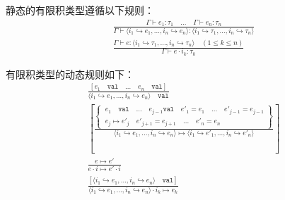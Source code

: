 静态的有限积类型遵循以下规则：
\begin{subequations}
    \begin{gather}
    \label{equ:10.3a}\frac{\Gamma \vdash e_1 : \tau_1 \quad \dots \quad \Gamma \vdash e_n : \tau_n}
    {\Gamma \vdash \langle i_1 \hookrightarrow e_1,\dots,i_n\hookrightarrow e_n \rangle
    : \langle i_1 \hookrightarrow \tau_1,\dots,i_n \hookrightarrow \tau_n \rangle} \\
    \label{equ:10.3b}\frac{\Gamma \vdash e : \langle i_1 \hookrightarrow \tau_1,\dots,i_n \hookrightarrow \tau_n \rangle
    \quad (1\leq k \leq n)}
    {\Gamma \vdash e \cdot i_k : \tau_k}
    \end{gather}
\end{subequations}


有限积类型的动态规则如下：
\begin{subequations}
    \begin{gather}
    \frac{[e_1 \quad \mathtt{val} \quad \dots \quad e_n \quad \mathtt{val}]}
    {\langle i_1 \hookrightarrow e_1,\dots,i_n\hookrightarrow e_n \rangle \quad \mathtt{val}} \\
    \label{rule10.4b}\left[
        \frac{\left\{\
        \begin{array}{l}
            e_1 \quad \mathtt{val} \quad \dots \quad e_{j-1} \mathtt{val} \quad e'_1=e_1 \quad \dots \quad e'_{j-1}=e_{j-1}  \\
            e_j \longmapsto e'_j \quad e'_{j+1}=e_{j+1} \quad \dots \quad e'_n=e_n
        \end{array}
        \right\}}
        {\langle i_1 \hookrightarrow e_1,\dots,i_n\hookrightarrow e_n \rangle
        \longmapsto \langle i_1 \hookrightarrow e'_1,\dots,i_n\hookrightarrow e'_n \rangle}
    \right] \\
    \frac{e \longmapsto e'}{e\cdot i \longmapsto e' \cdot i} \\
    \frac{[\langle i_1 \hookrightarrow e_1,\dots,i_n\hookrightarrow e_n \rangle \quad \mathtt{val}]}
    {\langle i_1 \hookrightarrow e_1,\dots,i_n\hookrightarrow e_n \rangle \cdot i_k \longmapsto e_k}
    \end{gather}
\end{subequations}


